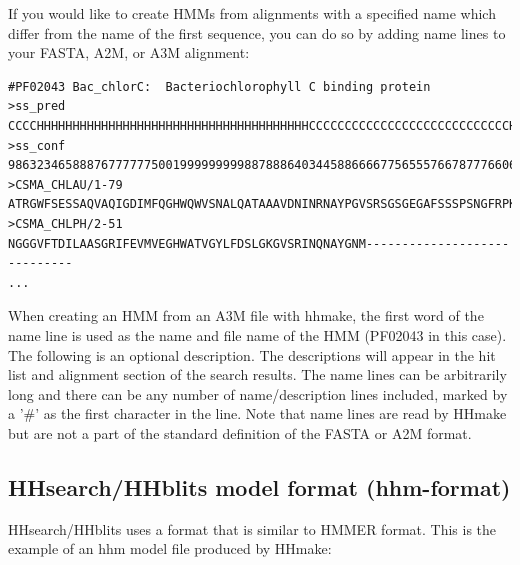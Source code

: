 \documentclass[11pt,a4paper]{article}
\begin{document}
If you would like to create HMMs from alignments with a specified name which differ 
from the name of the first sequence, you can do so by adding name lines to 
your FASTA, A2M, or A3M alignment:

\scriptsize\begin{verbatim}
#PF02043 Bac_chlorC:  Bacteriochlorophyll C binding protein
>ss_pred
CCCCHHHHHHHHHHHHHHHHHHHHHHHHHHHHHHHHHHHHHHCCCCCCCCCCCCCCCCCCCCCCCCCCCCHHHHHHHCC
>ss_conf
9863234658887677777750019999999998878886403445886666775655576678777660667633039
>CSMA_CHLAU/1-79
ATRGWFSESSAQVAQIGDIMFQGHWQWVSNALQATAAAVDNINRNAYPGVSRSGSGEGAFSSSPSNGFRPKRIRSRFNR
>CSMA_CHLPH/2-51
NGGGVFTDILAASGRIFEVMVEGHWATVGYLFDSLGKGVSRINQNAYGNM-----------------------------
...
\end{verbatim}\normalsize

When creating an HMM from an A3M file with hhmake, the first word of the name line is 
used as the name and file name of the HMM (PF02043 in this case). The following is an 
optional description. The descriptions will appear in the hit list and alignment section 
of the search results. The name lines can be arbitrarily long and there can be any number of 
name/description lines included, marked by a '\#' as the first character in the line. 
Note that name lines are read by HHmake but are not a part of the standard definition
of the FASTA or A2M format.
 

\subsection{HHsearch/HHblits model format (hhm-format)}

HHsearch/HHblits uses a format that is similar to HMMER format. 
This is the example of an hhm model file produced by HHmake:
\end{document}
